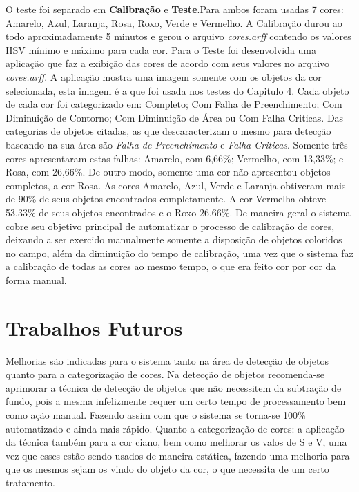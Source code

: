 O teste foi separado em \textbf{Calibração} e \textbf{Teste}.Para ambos foram usadas 7 cores: Amarelo, Azul, Laranja, Rosa, Roxo, Verde e Vermelho. A Calibração durou ao todo aproximadamente 5 minutos e gerou o arquivo \textit{cores.arff} contendo os valores HSV mínimo e máximo para cada cor. Para o Teste foi desenvolvida uma aplicação que faz a exibição das cores de acordo com seus valores no arquivo \textit{cores.arff}. A aplicação mostra uma imagem somente com os objetos da cor selecionada, esta imagem é a que foi usada nos testes do Capitulo 4. Cada objeto de cada cor foi categorizado em: Completo; Com Falha de Preenchimento; Com Diminuição de Contorno; Com Diminuição de Área ou Com Falha Criticas. Das categorias de objetos citadas, as que descaracterizam o mesmo para detecção baseando na sua área são \textit{Falha de Preenchimento} e \textit{Falha Criticas}. Somente tr\^{e}s cores apresentaram estas falhas: Amarelo, com 6,66\%; Vermelho, com 13,33\%; e Rosa, com 26,66\%. De outro modo, somente uma cor não apresentou objetos completos, a cor Rosa. As cores Amarelo, Azul, Verde e Laranja obtiveram mais de 90\% de seus objetos encontrados completamente. A cor Vermelha obteve 53,33\% de seus objetos encontrados e o Roxo 26,66\%. 
De maneira geral o sistema cobre seu objetivo principal de automatizar o processo de calibração de cores, deixando a ser exercido manualmente somente a disposição de objetos coloridos no campo, além da diminuição do tempo de calibração, uma vez que o sistema faz a calibração de todas as cores ao mesmo tempo, o que era feito cor por cor da forma manual.	

\section{Trabalhos Futuros}
Melhorias são indicadas para o sistema tanto na área de detecção de objetos quanto para a categorização de cores. Na detecção de objetos recomenda-se aprimorar a técnica de detecção de objetos que não necessitem da subtração de fundo, pois a mesma infelizmente requer um certo tempo de processamento bem como ação manual. Fazendo assim com que o sistema se torna-se 100\% automatizado e ainda mais rápido. Quanto a categorização de cores: a aplicação da técnica também para a cor ciano, bem como melhorar os valos de S e V, uma vez que esses estão sendo usados de maneira estática, fazendo uma melhoria para que os mesmos sejam os vindo do objeto da cor, o que necessita de um certo tratamento.